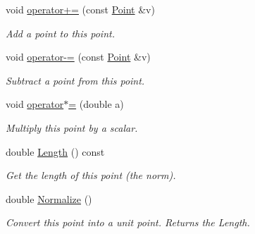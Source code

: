 \begin{DoxyCompactItemize}
\mbox{\label{structp2t_1_1Point_a114de25986403a4096c16332d388372d}} 
void \hyperlink{structp2t_1_1Point_a114de25986403a4096c16332d388372d}{operator+=} (const \hyperlink{structp2t_1_1Point}{Point} \&v)
\begin{DoxyCompactList}\small\item\em Add a point to this point. \end{DoxyCompactList}\item 
\mbox{\label{structp2t_1_1Point_a7d22374466d39be1624a895648d1f980}} 
void \hyperlink{structp2t_1_1Point_a7d22374466d39be1624a895648d1f980}{operator-\/=} (const \hyperlink{structp2t_1_1Point}{Point} \&v)
\begin{DoxyCompactList}\small\item\em Subtract a point from this point. \end{DoxyCompactList}\item 
\mbox{\label{structp2t_1_1Point_a833e141215999f1b467fbf2915240ed7}} 
void \hyperlink{structp2t_1_1Point_a833e141215999f1b467fbf2915240ed7}{operator$\ast$=} (double a)
\begin{DoxyCompactList}\small\item\em Multiply this point by a scalar. \end{DoxyCompactList}\item 
\mbox{\label{structp2t_1_1Point_a03e8d1c1296721f56c4dee2e61d45744}} 
double \hyperlink{structp2t_1_1Point_a03e8d1c1296721f56c4dee2e61d45744}{Length} () const
\begin{DoxyCompactList}\small\item\em Get the length of this point (the norm). \end{DoxyCompactList}\item 
\mbox{\label{structp2t_1_1Point_ad8add2f6f3c4a220bc5741510701f9f7}} 
double \hyperlink{structp2t_1_1Point_ad8add2f6f3c4a220bc5741510701f9f7}{Normalize} ()
\begin{DoxyCompactList}\small\item\em Convert this point into a unit point. Returns the Length. \end{DoxyCompactList}\end{DoxyCompactItemize}
